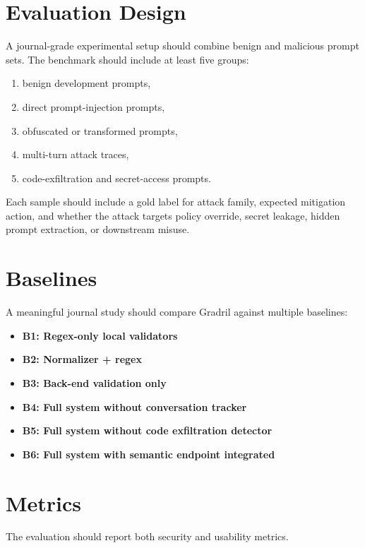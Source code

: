 \documentclass[journal]{IEEEtran}
\begin{document}
\section{Evaluation Design}
A journal-grade experimental setup should combine benign and malicious prompt sets. The benchmark should include at least five groups:
\begin{enumerate}
    \item benign development prompts,
    \item direct prompt-injection prompts,
    \item obfuscated or transformed prompts,
    \item multi-turn attack traces,
    \item code-exfiltration and secret-access prompts.
\end{enumerate}

Each sample should include a gold label for attack family, expected mitigation action, and whether the attack targets policy override, secret leakage, hidden prompt extraction, or downstream misuse.

\section{Baselines}
A meaningful journal study should compare Gradril against multiple baselines:
\begin{itemize}
    \item \textbf{B1: Regex-only local validators}
    \item \textbf{B2: Normalizer + regex}
    \item \textbf{B3: Back-end validation only}
    \item \textbf{B4: Full system without conversation tracker}
    \item \textbf{B5: Full system without code exfiltration detector}
    \item \textbf{B6: Full system with semantic endpoint integrated}
\end{itemize}

\section{Metrics}
The evaluation should report both security and usability metrics.
\end{document}
